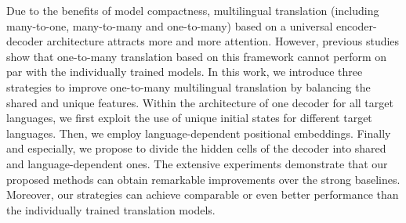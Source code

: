 Due to the benefits of model compactness, multilingual translation (including many-to-one, many-to-many and one-to-many) based on a universal encoder-decoder architecture attracts more and more attention. However, previous studies show that one-to-many translation based on this framework cannot perform on par with the individually trained models. In this work, we introduce three strategies to improve one-to-many multilingual translation by balancing the shared and unique features. Within the architecture of one decoder for all target languages, we first exploit the use of unique initial states for different target languages. Then, we employ language-dependent positional embeddings. Finally and especially, we propose to divide the hidden cells of the decoder into shared and language-dependent ones. The extensive experiments demonstrate that our proposed methods can obtain remarkable improvements over the strong baselines. Moreover, our strategies can achieve comparable or even better performance than the individually trained translation models.
